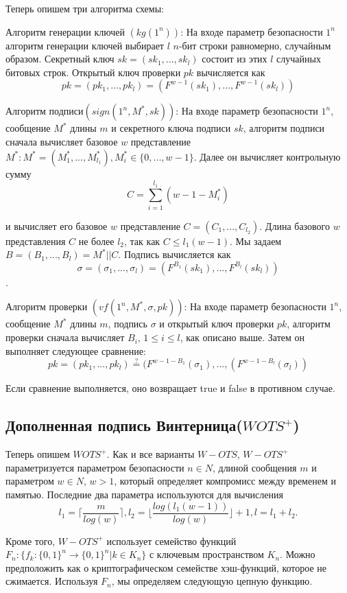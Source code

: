 \documentclass[a4paper, 14pt]{extarticle}
\begin{document}
Теперь опишем три алгоритма схемы:

Алгоритм генерации ключей $(kg(1^{n}))$: На входе параметр безопасности $1^{n}$ алгоритм генерации ключей выбирает $l$ $n$-бит строки равномерно, случайным образом. Секретный ключ $sk = (sk_{1}, ..., sk_{l})$ состоит из этих $l$ случайных битовых строк. Открытый ключ проверки $pk$ вычисляется как
\[ pk = (pk_{1}, ..., pk_{l}) = (F^{w - 1}(sk_{1}), ..., F^{w - 1}(sk_{l})) \]

Алгоритм подписи$(sign(1^{n}, M^{*}, sk))$: На входе параметр безопасности $1^{n}$, сообщение $M^{*}$ длины $m$ и секретного ключа подписи $sk$, алгоритм подписи сначала вычисляет базовое $w$ представление $M^{*}: M^{*} = (M^{*}_{1}, ..., M^{*}_{l_{1}}), M^{*}_{i} \in \{0, ..., w - 1\}$. Далее он вычисляет контрольную сумму
\[ C = \sum^{l_{1}}_{i = 1}(w - 1 - M^{*}_{i}) \]

и вычисляет его базовое $w$ представление $C = (C_{1}, ..., C_{l_2})$. Длина базового $w$ представления $C$ не более $l_{2}$, так как $C \leq l_{1}(w - 1)$. Мы задаем $B = (B_{1}, ..., B_{l}) = M^{*} || C$. Подпись вычисляется как
\[ \sigma = (\sigma_{1}, ..., \sigma_{l}) = (F^{B_1}(sk_{1}), ..., F^{B_l}(sk_{l})) \].

Алгоритм проверки $(vf(1^{n}, M^{*}, \sigma, pk))$: На входе параметр безопасности $1^{n}$, сообщение $M^{*}$ длины $m$, подпись $\sigma$ и открытый ключ проверки $pk$, алгоритм проверки сначала вычисляет $B_{i}$, $ 1 \leq i \leq l$, как описано выше. Затем он выполняет следующее сравнение:
\[ pk = (pk_{1}, ..., pk_{l}) \stackrel{?}= (F^{w - 1 - B_{1}}(\sigma_{1}), ..., (F^{w - 1 - B_{l}}(\sigma_{l})) \]

Если сравнение выполняется, оно возвращает true и false в противном случае.
\subsection{Дополненная подпись Винтерница($WOTS^{+}$)}
Теперь опишем $WOTS^{+}$. Как и все варианты $W-OTS$, $W-OTS^{+}$ параметризуется параметром безопасности $n \in N$, длиной сообщения $m$ и параметром $w \in N$, $w > 1$, который определяет компромисс между временем и памятью. Последние два параметра используются для вычисления
\[ l_{1} = \Bigg \lceil \frac{m}{log(w)} \Bigg \rceil, l_{2} = \Bigg \lfloor \frac{log(l_{1}(w - 1))}{log(w)} \Bigg \rfloor + 1, l = l_{1} + l_{2}. \]

Кроме того, $W-OTS^{+}$ использует семейство функций $F_{n} : \{f_{k} : \{0, 1\}^{n} \rightarrow \{0, 1\}^{n}|k \in K_{n}\}$ с ключевым пространством $K_{n}$. Можно предположить как о криптографическом семействе хэш-функций, которое не сжимается. Используя $F_{n}$, мы определяем следующую цепную функцию.
\end{document}

